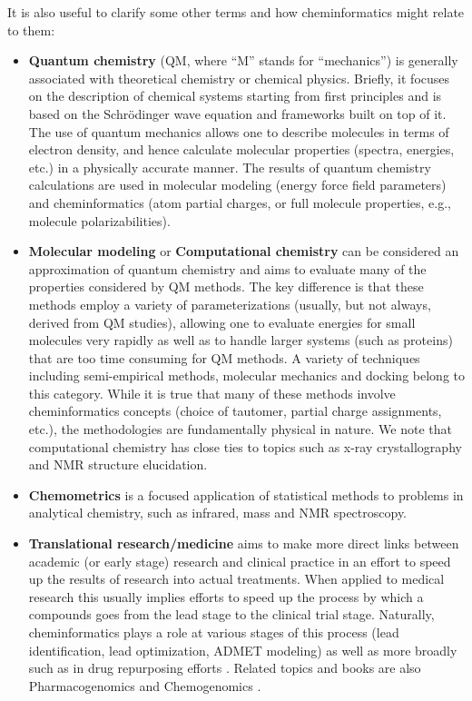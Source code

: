 \documentclass{sig-alternate}
\begin{document}
It is also useful to clarify some other terms and how
cheminformatics might relate to them:
\begin{itemize}
\item \textbf{Quantum chemistry} (QM, where ``M'' stands for ``mechanics'') is generally associated with
  theoretical chemistry or chemical physics. Briefly, it focuses on
  the description of chemical systems starting from first principles
  and is based on the Schr\"{o}dinger wave equation and frameworks
  built on top of it. The use of quantum mechanics allows one to
  describe molecules in terms of electron density, and hence calculate
  molecular properties (spectra, energies, etc.) in a physically
  accurate manner.  The results of quantum chemistry calculations are
  used in molecular modeling (energy force field parameters) and
  cheminformatics (atom partial charges, or full molecule properties,
  e.g., molecule polarizabilities).
\item \textbf{Molecular modeling} or \textbf{Computational chemistry}
  can be considered an approximation of quantum chemistry and aims to
  evaluate many of the properties considered by QM methods. The key
  difference is that these methods employ a variety of
  parameterizations (usually, but not always, derived from QM studies),
  allowing one to evaluate energies for small molecules very rapidly
  as well as to handle larger systems (such as proteins) that are too
  time consuming for QM methods. A variety of techniques including
  semi-empirical methods, molecular mechanics and docking belong to
  this category. While it is true that many of these methods involve
  cheminformatics concepts (choice of tautomer, partial charge
  assignments, etc.), the methodologies are fundamentally physical in
  nature. We note that computational chemistry has close ties to
  topics such as x-ray crystallography and NMR structure elucidation.
\item \textbf{Chemometrics} is a focused application of statistical
  methods to problems in analytical chemistry, such as infrared, mass
  and NMR spectroscopy.
\item \textbf{Translational research/medicine} aims to make more
  direct links between academic (or early stage) research and clinical
  practice in an effort to speed up the results of research into
  actual treatments. When applied to medical research this usually
  implies efforts to speed up the process by which a compounds goes
  from the lead stage to the clinical trial stage. Naturally,
  cheminformatics plays a role at various stages of this process (lead
  identification, lead optimization, ADMET modeling) as well as more
  broadly such as in drug repurposing
  efforts \cite{Dudley:2011fk,Swamidass:2011uq}. Related topics and
  books are also Pharmacogenomics \cite{yan2008pharmacogenomics} and
  Chemogenomics \cite{kubinyi2004chemogenomics}.
\end{itemize}
\end{document}
